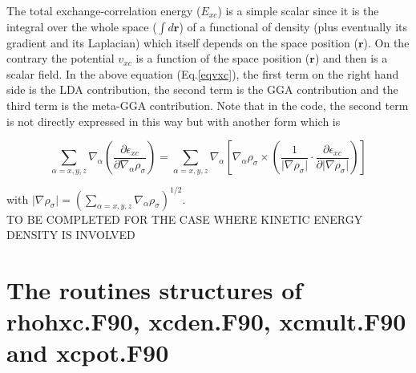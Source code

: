 \documentclass[a4paper,12pt]{report}
\begin{document}
The total exchange-correlation energy ($E_{xc}$) is a simple scalar since it is the integral over the whole space ($\int d\mathbf{r}$) of a functional of density (plus eventually its gradient and its Laplacian) which itself depends on the space position ($\mathbf{r}$). On the contrary the potential $v_{xc}$ is a function of the space position ($\mathbf{r}$) and then is a scalar field. In the above equation (Eq.\ref{eqvxc}), the first term on the right hand side is the LDA contribution, the second term is the GGA contribution and the third term is the meta-GGA contribution.
Note that in the code, the second term is not directly expressed in this way but with another form which is

\begin{equation}
\sum_{\alpha=x,y,z} \nabla_{\alpha} \left( \frac{\partial \epsilon_{xc}}{\partial \nabla_{\alpha} \rho_{\sigma}} \right) = \sum_{\alpha=x,y,z} \nabla_{\alpha} \left[ \nabla_{\alpha} \rho_{\sigma} \times \left( \frac{1}{\vert \nabla \rho_{\sigma} \vert }\cdotp \frac{\partial \epsilon_{xc}}{\partial \vert \nabla \rho_{\sigma}\vert } \right) \right]
\end{equation}

with $\vert \nabla \rho_{\sigma} \vert = \left(\sum_{\alpha=x,y,z} \nabla_{\alpha}\rho_{\sigma}\right)^{1/2}$.\\

TO BE COMPLETED FOR THE CASE WHERE KINETIC ENERGY DENSITY IS INVOLVED

\chapter{The routines structures of rhohxc.F90, xcden.F90, xcmult.F90 and xcpot.F90}
\end{document}
